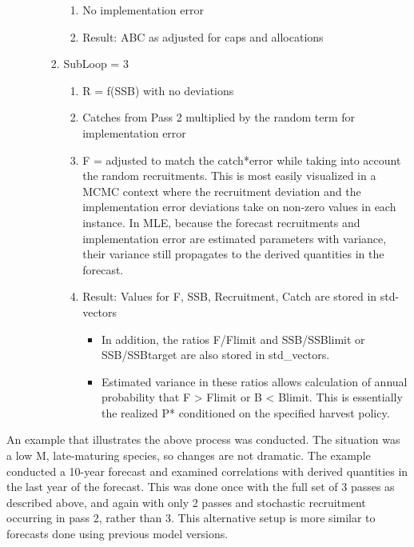 \begin{enumerate}
\begin{enumerate}
\begin{enumerate}
\begin{enumerate}
				\item No implementation error
				\item Result: ABC as adjusted for caps and allocations
			\end{enumerate}
			\item SubLoop = 3
			\begin{enumerate}
				\item R = f(SSB) with no deviations
				\item Catches from Pass 2 multiplied by the random term for implementation error
				\item F = adjusted to match the catch*error while taking into account the random recruitments. This is most easily visualized in a MCMC context where the recruitment deviation and the implementation error deviations take on non-zero values in each instance. In MLE, because the forecast recruitments and implementation error are estimated parameters with variance, their variance still propagates to the derived quantities in the forecast.
				\item Result: Values for F, SSB, Recruitment, Catch are stored in std-vectors
				\begin{itemize}
					\item In addition, the ratios F/Flimit and SSB/SSBlimit or SSB/SSBtarget are also stored in std\_vectors.
					\item Estimated variance in these ratios allows calculation of annual probability that F > Flimit or B < Blimit. This is essentially the realized P* conditioned on the specified harvest policy.
				\end{itemize}
			\end{enumerate}
		\end{enumerate}
	\end{enumerate}
\end{enumerate}

An example that illustrates the above process was conducted. The situation was a low M, late-maturing species, so changes are not dramatic. The example conducted a 10-year forecast and examined correlations with derived quantities in the last year of the forecast. This was done once with the full set of 3 passes as described above, and again with only 2 passes and stochastic recruitment occurring in pass 2, rather than 3. This alternative setup is more similar to forecasts done using previous model versions.

